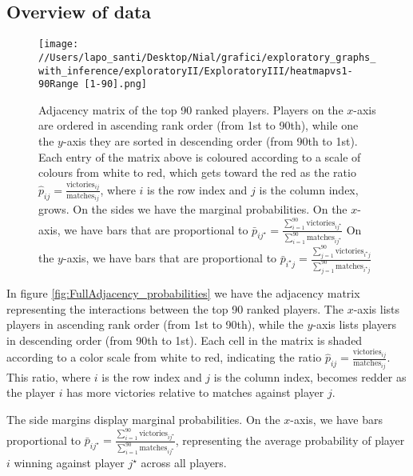 \documentclass[11pt]{amsart}
\begin{document}
\subsection{Overview of data}

\begin{figure}
\begin{center}
\texttt{[image: //Users/lapo\_santi/Desktop/Nial/grafici/exploratory\_graphs\_with\_inference/exploratoryII/ExploratoryIII/heatmapvs1-90Range [1-90].png]}
\caption{Adjacency matrix of the top 90 ranked players. Players on the $x$-axis are ordered in ascending rank order (from 1st to 90th), while one the $y$-axis they are sorted in descending order (from 90th to 1st). Each entry of the matrix above is coloured according to a scale of colours from white to red, which gets toward the red as the ratio $\hat{p}_{ij}= \frac{\text{victories}_{ij}}{\text{matches}_{ij}}$, where $i$ is the row index and $j$ is the column index, grows. 
On the sides we have the marginal probabilities. On the $x$-axis, we have bars that are proportional to $\bar{p}_{ij^\star}=\frac{\sum_{i=1}^{90}  \text{victories}_{ij^\star}}{\sum_{i=1}^{90}\text{matches}_{i j^\star}}$
On the $y$-axis, we have bars that are proportional to $\bar{p}_{i^\star j}=\frac{\sum_{j=1}^{90}  \text{victories}_{i^\star j}}{\sum_{j=1}^{90}\text{matches}_{i^\star j}}$}
\label{fig:FullAdjacency_probabilities}
\end{center}
\end{figure}

In figure \eqref{fig:FullAdjacency_probabilities} we have the adjacency matrix representing the interactions between the top 90 ranked players. The $x$-axis lists players in ascending rank order (from 1st to 90th), while the $y$-axis lists players in descending order (from 90th to 1st). Each cell in the matrix is shaded according to a color scale from white to red, indicating the ratio $\hat{p}_{ij} = \frac{\text{victories}_{ij}}{\text{matches}_{ij}}$. This ratio, where $i$ is the row index and $j$ is the column index, becomes redder as the player $i$ has more victories relative to matches against player $j$.

The side margins display marginal probabilities. On the $x$-axis, we have bars proportional to $\bar{p}_{ij^\star} = \frac{\sum_{i=1}^{90} \text{victories}_{ij^\star}}{\sum_{i=1}^{90}\text{matches}_{ij^\star}}$, representing the average probability of player $i$ winning against player $j^\star$ across all players. 
\end{document}
